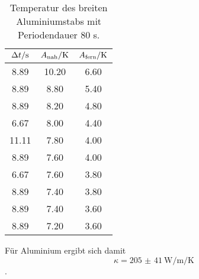 \begin{table}

	\centering

	\caption{Temperatur des breiten Aluminiumstabs mit Periodendauer 80 s.}


	\begin{tabular}{S[table-format=3.2] S[table-format=3.2]S[table-format=3.2]}

		\toprule

		{$\Delta t/\si[per-mode=reciprocal]{\second}$}&{$A_\text{nah}/\si[per-mode=reciprocal]{\kelvin}$}&{$A_\text{fern}/\si[per-mode=reciprocal]{\kelvin}$} \\

		\midrule

		8.89 & 10.20 & 6.60 \\

		8.89 & 8.80 & 5.40 \\

		8.89 & 8.20 & 4.80 \\

		6.67 & 8.00 & 4.40 \\

		11.11 & 7.80 & 4.00 \\

		8.89 & 7.60 & 4.00 \\

		6.67 & 7.60 & 3.80 \\

		8.89 & 7.40 & 3.80 \\

		8.89 & 7.40 & 3.60 \\

		8.89 & 7.20 & 3.60 \\

		\bottomrule

	\end{tabular}

	\label{tab:tab3}

\end{table}

Für Aluminium ergibt sich damit \[\kappa = \SI{205(41)}{\watt\per\metre\per\kelvin}\].

